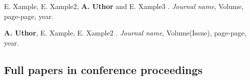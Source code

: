 \documentclass{article}
\begin{document}
\vspace*{1em}

\begin{enumerate}[wide = 0pt, widest = {[4]}, leftmargin =*]

\item[{[1]}] E. Xample, E. Xample2, \textbf{A. Uthor} and E. Xample3
.
\newblock \emph{Journal name}, Volume, page-page, year.

\vspace*{1em}

\item[{[2]}] \textbf{A. Uthor}, E. Xample, E. Xample2
.
\newblock \emph{Journal name}, Volume(Issue), page-page, year.

\end{enumerate}

\vspace*{1em}

\subsection*{Full papers in conference proceedings}
\vspace*{1em}
\end{document}
